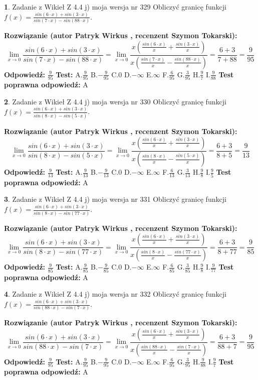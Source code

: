 \documentclass[12pt, a4paper]{article}
\theoremstyle{definition} %
\newtheorem{zad}{}
\newcommand{\zadStart}[1]{\begin{zad}#1\newline}
\newcommand{\zadStop}{\end{zad}}
\newcommand{\rozwStart}[2]{\noindent \textbf{Rozwiązanie (autor #1 , recenzent #2): }\newline}
\newcommand{\rozwStop}{\newline}
\newcommand{\odpStart}{\noindent \textbf{Odpowiedź:}\newline}
\newcommand{\odpStop}{\newline}
\newcommand{\testStart}{\noindent \textbf{Test:}\newline}
\newcommand{\testStop}{\newline}
\newcommand{\kluczStart}{\noindent \textbf{Test poprawna odpowiedź:}\newline}
\newcommand{\kluczStop}{\newline}
\begin{document}
\zadStart{Zadanie z Wikieł Z 4.4 j) moja wersja nr 329}
Obliczyć granicę funkcji $f(x)=\frac{sin(6\cdot x) +sin(3\cdot x)}{sin(7\cdot x) -sin(88\cdot x)}$.
\zadStop
\rozwStart{Patryk Wirkus}{Szymon Tokarski}
$$\lim\limits_{x\to 0}\frac{sin(6\cdot x) +sin(3\cdot x)}{sin(7\cdot x) -sin(88\cdot x)}=\lim\limits_{x\to 0}\frac{x(\frac{sin(6\cdot x)}{x}+\frac{sin(3\cdot x)}{x})}{x(\frac{sin(7\cdot x)}{x}-\frac{sin(88\cdot x)}{x})}=\frac{6+3}{7+88} = \frac{9}{95}$$
\rozwStop
\odpStart
$\frac{9}{95}$
\odpStop
\testStart
A.$\frac{9}{95}$
B.$-\frac{9}{95}$
C.$0$
D.$-\infty$
E.$\infty$
F.$\frac{6}{95}$
G.$\frac{3}{95}$
H.$\frac{9}{7}$
I.$\frac{9}{88}$
\testStop
\kluczStart
A
\kluczStop



\zadStart{Zadanie z Wikieł Z 4.4 j) moja wersja nr 330}
Obliczyć granicę funkcji $f(x)=\frac{sin(6\cdot x) +sin(3\cdot x)}{sin(8\cdot x) -sin(5\cdot x)}$.
\zadStop
\rozwStart{Patryk Wirkus}{Szymon Tokarski}
$$\lim\limits_{x\to 0}\frac{sin(6\cdot x) +sin(3\cdot x)}{sin(8\cdot x) -sin(5\cdot x)}=\lim\limits_{x\to 0}\frac{x(\frac{sin(6\cdot x)}{x}+\frac{sin(3\cdot x)}{x})}{x(\frac{sin(8\cdot x)}{x}-\frac{sin(5\cdot x)}{x})}=\frac{6+3}{8+5} = \frac{9}{13}$$
\rozwStop
\odpStart
$\frac{9}{13}$
\odpStop
\testStart
A.$\frac{9}{13}$
B.$-\frac{9}{13}$
C.$0$
D.$-\infty$
E.$\infty$
F.$\frac{6}{13}$
G.$\frac{3}{13}$
H.$\frac{9}{8}$
I.$\frac{9}{5}$
\testStop
\kluczStart
A
\kluczStop



\zadStart{Zadanie z Wikieł Z 4.4 j) moja wersja nr 331}
Obliczyć granicę funkcji $f(x)=\frac{sin(6\cdot x) +sin(3\cdot x)}{sin(8\cdot x) -sin(77\cdot x)}$.
\zadStop
\rozwStart{Patryk Wirkus}{Szymon Tokarski}
$$\lim\limits_{x\to 0}\frac{sin(6\cdot x) +sin(3\cdot x)}{sin(8\cdot x) -sin(77\cdot x)}=\lim\limits_{x\to 0}\frac{x(\frac{sin(6\cdot x)}{x}+\frac{sin(3\cdot x)}{x})}{x(\frac{sin(8\cdot x)}{x}-\frac{sin(77\cdot x)}{x})}=\frac{6+3}{8+77} = \frac{9}{85}$$
\rozwStop
\odpStart
$\frac{9}{85}$
\odpStop
\testStart
A.$\frac{9}{85}$
B.$-\frac{9}{85}$
C.$0$
D.$-\infty$
E.$\infty$
F.$\frac{6}{85}$
G.$\frac{3}{85}$
H.$\frac{9}{8}$
I.$\frac{9}{77}$
\testStop
\kluczStart
A
\kluczStop



\zadStart{Zadanie z Wikieł Z 4.4 j) moja wersja nr 332}
Obliczyć granicę funkcji $f(x)=\frac{sin(6\cdot x) +sin(3\cdot x)}{sin(88\cdot x) -sin(7\cdot x)}$.
\zadStop
\rozwStart{Patryk Wirkus}{Szymon Tokarski}
$$\lim\limits_{x\to 0}\frac{sin(6\cdot x) +sin(3\cdot x)}{sin(88\cdot x) -sin(7\cdot x)}=\lim\limits_{x\to 0}\frac{x(\frac{sin(6\cdot x)}{x}+\frac{sin(3\cdot x)}{x})}{x(\frac{sin(88\cdot x)}{x}-\frac{sin(7\cdot x)}{x})}=\frac{6+3}{88+7} = \frac{9}{95}$$
\rozwStop
\odpStart
$\frac{9}{95}$
\odpStop
\testStart
A.$\frac{9}{95}$
B.$-\frac{9}{95}$
C.$0$
D.$-\infty$
E.$\infty$
F.$\frac{6}{95}$
G.$\frac{3}{95}$
H.$\frac{9}{88}$
I.$\frac{9}{7}$
\testStop
\kluczStart
A
\kluczStop
\end{document}
